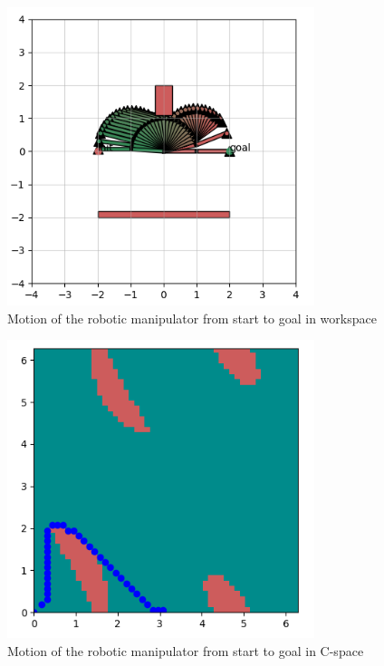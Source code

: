 \documentclass{article}
\begin{document}
\begin{figure}[h]
    \centering
    \includegraphics[width=0.8\textwidth]{manipulatorWorkspace.png}
    \caption{Motion of the robotic manipulator from start to goal in workspace}
    \label{fig:manipulatorWorkspace}
\end{figure}

\begin{figure}[h]
    \centering
    \includegraphics[width=0.8\textwidth]{manipulatorCspace.png}
    \caption{Motion of the robotic manipulator from start to goal in C-space}
    \label{fig:manipulatorCspace}
\end{figure}
\end{document}
